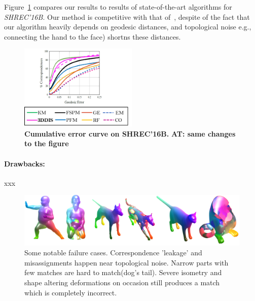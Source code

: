 \documentclass[10pt,twocolumn,letterpaper]{article}
\newcommand{\colornote}[3]{{\color{#1}\bf{#2: #3}\normalfont}}
\newcommand{\colornote}[3]{}
\newcommand {\ayellet}[1]{\colornote{blue}{AT}{#1}}
\begin{document}
Figure~\ref{fig:Shrec16Top} compares our results to results of state-of-the-art algorithms for {\em SHREC'16B}.
Our method is competitive with that of~\cite{vestner2017efficient}, despite of the fact that our algorithm heavily depends on geodesic distances, and topological noise e.g., connecting the hand to the face) shortns these distances.

\begin{figure}[htb]
	\label{fig:Shrec16Top}
	\centering
	\includegraphics[width=0.5\textwidth]{figures/SHREC16Top.png}
	\caption{{\bf Cumulative error curve on SHREC'16B.} \ayellet{same changes to the figure}}
\end{figure}

\paragraph{Drawbacks:} xxx
\begin{figure}[htb]
	\centering
	\includegraphics[width=1\textwidth]{figures/failures.png}
	\caption{Some notable failure cases. Correspondence 'leakage' and misassignments happen near topological noise. Narrow parts with few matches are hard to match(dog's tail). Severe isometry and shape altering deformations on occasion still produces a match which is completely incorrect.}
\end{figure}
\end{document}
